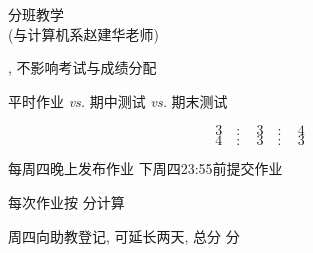 
\begin{frame}{}
  \begin{center}
    {\large 分班教学 \\ (与计算机系赵建华老师)}

    \vspace{0.60cm}
    {\large {}, 不影响考试与成绩分配}
  \end{center}
\end{frame}

\begin{frame}{}
  \begin{center}
    {\large 平时作业 {\it vs.} 期中测试 {\it vs.} 期末测试}

    \[
      3 \quad:\quad 3 \quad:\quad 4
    \]
    \[
      4 \quad:\quad 3 \quad:\quad 3
    \]

    \vspace{0.80cm}
  \end{center}
\end{frame}

\begin{frame}{}
  \begin{center}
    每周四晚上发布作业 \qquad 下周四23:55前提交作业

    \vspace{1.00cm}
    每次作业按  分计算

    \vspace{0.50cm}
     周四向助教登记, 可延长两天, 总分  分

    \vspace{0.50cm}
  \end{center}
\end{frame}

\begin{frame}{}
  \begin{center}

  \end{center}
\end{frame}

\begin{frame}{}
\end{frame}

